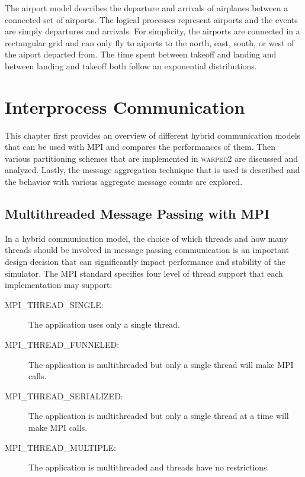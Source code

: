 \documentclass[11pt]{book}
\begin{document}
The airport model describes the departure and arrivals of airplanes between a connected
set of airports. The logical processes represent airports and the events are simply
departures and arrivals. For simplicity, the airports are connected in a rectangular grid
and can only fly to aiports to the north, east, south, or west of the aiport departed from.
The time spent between takeoff and landing and between landing and takeoff both follow an
exponential distributions.



\chapter[Communication]{Interprocess Communication} \label{partitioning_communication}

This chapter first provides an overview of different hybrid communication models that can be
used with MPI and compares the performances of them. Then various partitioning schemes that are
implemented in \textsc{warped2} are discussed and analyzed. Lastly, the message aggregation
technique that is used is described and the behavior with various aggregate message counts are
explored.

\section{Multithreaded Message Passing with MPI}

In a hybrid communication model, the choice of which threads and how many threads should be
involved in message passing communication is an important design decision that can significantly
impact performance and stability of the simulator. The MPI standard specifies four level of
thread support that each implementation may support:

\begin{description}
    \item[MPI\_THREAD\_SINGLE:] The application uses only a single thread. 
    \item[MPI\_THREAD\_FUNNELED:] The application is multithreaded but only a single thread will
        make MPI calls.
    \item[MPI\_THREAD\_SERIALIZED:] The application is multithreaded but only a single thread at
        a time will make MPI calls.
    \item[MPI\_THREAD\_MULTIPLE:] The application is multithreaded and threads have no restrictions.
\end{description}
\end{document}
